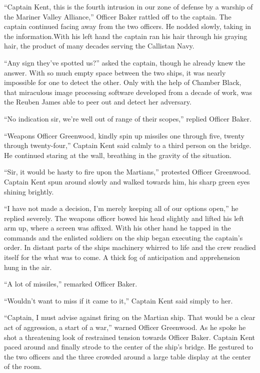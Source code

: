 \documentclass[12pt]{article} %
\begin{document}
``Captain Kent, this is the fourth intrusion in our zone of defense by a warship of the Mariner Valley Alliance,'' Officer Baker rattled off to the captain. The captain continued facing away from the two officers. He nodded slowly, taking in the information.With his left hand the captain ran his hair through his graying hair, the product of many decades serving the Callistan Navy.

``Any sign they've spotted us?'' asked the captain, though he already knew the answer. With so much empty space between the two ships, it was nearly impossible for one to detect the other. Only with the help of Chamber Black, that miraculous image processing software developed from a decade of work, was the Reuben James able to peer out and detect her adversary.

``No indication sir, we're well out of range of their scopes,'' replied Officer Baker. 

``Weapons Officer Greenwood, kindly spin up missiles one through five, twenty through twenty-four,'' Captain Kent said calmly to a third person on the bridge. He continued staring at the wall, breathing in the gravity of the situation.

``Sir, it would be hasty to fire upon the Martians,'' protested Officer Greenwood. Captain Kent spun around slowly and walked towards him, his sharp green eyes shining brightly.

``I have not made a decision, I'm merely keeping all of our options open,'' he replied severely. The weapons officer bowed his head slightly and lifted his left arm up, where a screen was affixed. With his other hand he tapped in the commands and the enlisted soldiers on the ship began executing the captain's order. In distant parts of the ships machinery whirred to life and the crew readied itself for the what was to come. A thick fog of anticipation and apprehension hung in the air.

``A lot of missiles,'' remarked Officer Baker. 

``Wouldn't want to miss if it came to it,'' Captain Kent said simply to her.

``Captain, I must advise against firing on the Martian ship. That would be a clear act of aggression, a start of a war,'' warned Officer Greenwood. As he spoke he shot a threatening look of restrained tension towards Officer Baker. Captain Kent paced around and finally strode to the center of the ship's bridge. He gestured to the two officers and the three crowded around a large table display at the center of the room.
\end{document}
